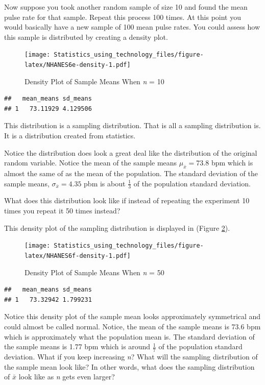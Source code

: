 \documentclass[
]{book}
\begin{document}
Now suppose you took another random sample of size 10 and found the mean pulse rate for that sample. Repeat this process 100 times. At this point you would basically have a new sample of 100 mean pulse rates. You could assess how this sample is distributed by creating a density plot.



\begin{figure}
\centering
\texttt{[image: Statistics\_using\_technology\_files/figure-latex/NHANES6e-density-1.pdf]}
\caption{\label{fig:NHANES6e-density}Density Plot of Sample Means When \emph{n} = 10}
\end{figure}

\begin{verbatim}
##   mean_means sd_means
## 1   73.11929 4.129506
\end{verbatim}

This distribution is a sampling distribution. That is all a sampling distribution is. It is a distribution created from statistics.

Notice the distribution does look a great deal like the distribution of the original random variable. Notice the mean of the sample means \(\mu_{\bar{x}} = 73.8\) bpm which is almost the same of as the mean of the population. The standard deviation of the sample means, \(\sigma_{\bar{x}}=4.35\) pbm is about \(\frac{1}{3}\) of the population standard deviation.

What does this distribution look like if instead of repeating the experiment 10 times you repeat it 50 times instead?

This density plot of the sampling distribution is displayed in (Figure \ref{fig:NHANES6f-density}).



\begin{figure}
\centering
\texttt{[image: Statistics\_using\_technology\_files/figure-latex/NHANES6f-density-1.pdf]}
\caption{\label{fig:NHANES6f-density}Density Plot of Sample Means When \emph{n} = 50}
\end{figure}

\begin{verbatim}
##   mean_means sd_means
## 1   73.32942 1.799231
\end{verbatim}

Notice this density plot of the sample mean looks approximately symmetrical and could almost be called normal. Notice, the mean of the sample means is 73.6 bpm which is approximately what the population mean is. The standard deviation of the sample means is 1.77 bpm which is around \(\frac{1}{7}\) of the population standard deviation. What if you keep increasing \emph{n}? What will the sampling distribution of the sample mean look like? In other words, what does the sampling distribution of \(\bar{x}\) look like as \emph{n} gets even larger?
\end{document}
